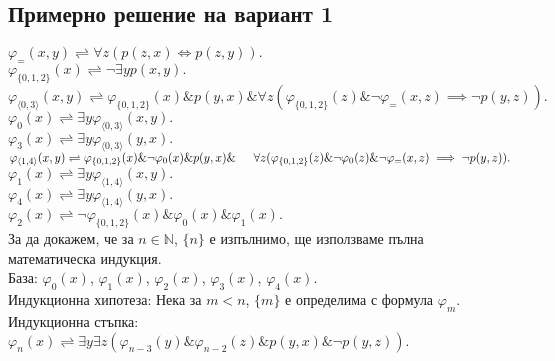 \documentclass{article}
\begin{document}
\subsection{Примерно решение на вариант 1}
$ \varphi_{=}(x, y) \rightleftharpoons \forall z (p(z, x) \Leftrightarrow p(z, y)). $\\
$ \varphi_{\{0,1,2\}}(x) \rightleftharpoons \lnot \exists y p(x, y).$\\
$ \varphi_{\langle 0, 3 \rangle}(x, y) \rightleftharpoons \varphi_{\{0,1,2\}}(x)\&p(y, x)\& \forall z ( \varphi_{\{0,1,2\}}(z)\&\lnot \varphi_{=}(x, z) \implies \lnot p(y, z)). $\\
$ \varphi_{0}(x) \rightleftharpoons \exists y \varphi_{\langle 0, 3 \rangle}(x, y) . $\\
$ \varphi_{3}(x) \rightleftharpoons \exists y \varphi_{\langle 0, 3 \rangle}(y, x) . $\\
$ \varphi_{\langle 1, 4 \rangle}(x, y) \rightleftharpoons \varphi_{\{0,1,2\}}(x)\&\lnot \varphi_{0}(x)\&p(y, x)\& \\ \indent \forall z ( \varphi_{\{0,1,2\}}(z)\&\lnot \varphi_{0}(z)\&\lnot \varphi_{=}(x, z) \implies \lnot p(y, z)). $\\
$ \varphi_{1}(x) \rightleftharpoons \exists y \varphi_{\langle 1, 4 \rangle}(x, y) . $\\
$ \varphi_{4}(x) \rightleftharpoons \exists y \varphi_{\langle 1, 4 \rangle}(y, x) . $\\
$ \varphi_{2}(x) \rightleftharpoons \lnot \varphi_{\{0,1,2\}}(x)\&\varphi_{0}(x)\&\varphi_{1}(x). $\\

За да докажем, че за $n \in \mathbb{N}$,  $\{n\}$ е изпълнимо, ще използваме пълна математическа индукция. \\
База: $\varphi_{0}(x)$, $\varphi_{1}(x)$, $\varphi_{2}(x)$, $\varphi_{3}(x)$, $\varphi_{4}(x)$. \\
Индукционна хипотеза: Нека за $m <n $, $\{m\}$ е определима с формула $\varphi_{m}$. \\
Индукционна стъпка: $ \varphi_{n}(x) \rightleftharpoons \exists y \exists z (\varphi_{n-3}(y)\&\varphi_{n-2}(z)\&p(y, x)\&\lnot p(y, z)). $\\
\end{document}
